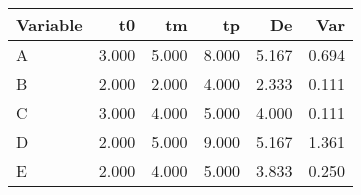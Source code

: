 \begin{tabular}{lrrrrr}
\toprule
Variable & t0 & tm & tp & De & Var \\
\midrule
A & 3.000 & 5.000 & 8.000 & 5.167 & 0.694 \\
B & 2.000 & 2.000 & 4.000 & 2.333 & 0.111 \\
C & 3.000 & 4.000 & 5.000 & 4.000 & 0.111 \\
D & 2.000 & 5.000 & 9.000 & 5.167 & 1.361 \\
E & 2.000 & 4.000 & 5.000 & 3.833 & 0.250 \\
\bottomrule
\end{tabular}
